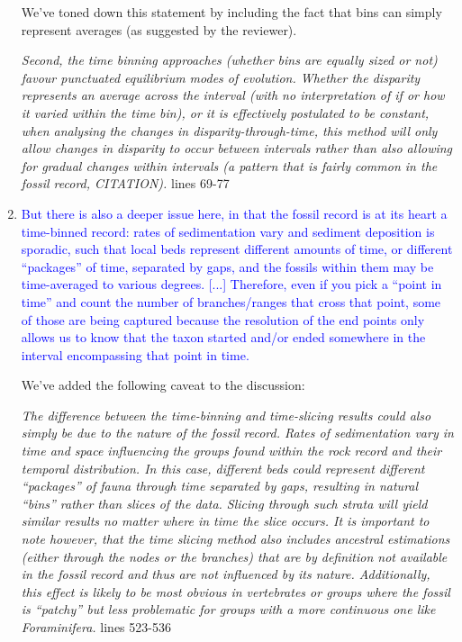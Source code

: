 \documentclass[12pt,letterpaper]{article}
\begin{document}
\begin{enumerate}
We've toned down this statement by including the fact that bins can simply represent averages (as suggested by the reviewer).

\textit{Second, the time binning approaches (whether bins are equally sized or not) favour punctuated equilibrium modes of evolution.
Whether the disparity represents an average across the interval (with no interpretation of if or how it varied within the time bin), or it is effectively postulated to be constant, when analysing the changes in disparity-through-time, this method will only allow changes in disparity to occur between intervals rather than also allowing for gradual changes within intervals (a pattern that is fairly common in the fossil record, CITATION).} lines 69-77

\item{\textcolor{blue}{But there is also a deeper issue here, in that the fossil record is at its heart a time-binned record: rates of sedimentation vary and sediment deposition is sporadic, such that local beds represent different amounts of time, or different ``packages'' of time, separated by gaps, and the fossils within them may be time-averaged to various degrees. [...] Therefore, even if you pick a ``point in time'' and count the number of branches/ranges that cross that point, some of those are being captured because the resolution of the end points only allows us to know that the taxon started and/or ended somewhere in the interval encompassing that point in time.}}

We've added the following caveat to the discussion:

\textit{The difference between the time-binning and time-slicing results could also simply be due to the nature of the fossil record.
Rates of sedimentation vary in time and space influencing the groups found within the rock record and their temporal distribution. 
In this case, different beds could represent different ``packages'' of fauna through time separated by gaps, resulting in natural ``bins'' rather than slices of the data.
Slicing through such strata will yield similar results no matter where in time the slice occurs.
It is important to note however, that the time slicing method also includes ancestral estimations (either through the nodes or the branches) that are by definition not available in the fossil record and thus are not influenced by its nature.
Additionally, this effect is likely to be most obvious in vertebrates or groups where the fossil is ``patchy'' but less problematic for groups with a more continuous one like Foraminifera.} lines 523-536


\end{enumerate}
\end{document}
